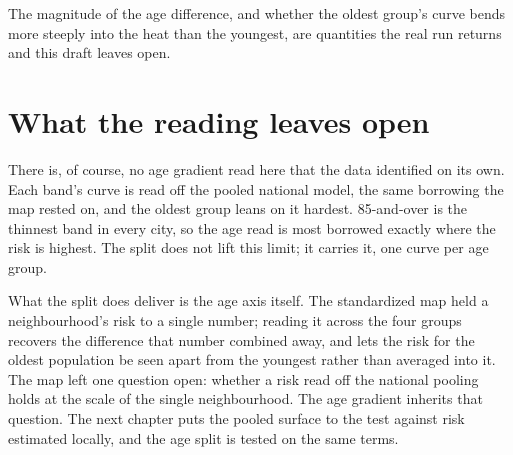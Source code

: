 The magnitude of the age difference, and whether the oldest group's curve
bends more steeply into the heat than the youngest, are quantities the real
run returns and this draft leaves open.

\section{What the reading leaves open}

There is, of course, no age gradient read here that the data identified on
its own. Each band's curve is read off the pooled national model, the same
borrowing the map rested on, and the oldest group leans on it hardest.
85-and-over is the thinnest band in every city, so the age read is most
borrowed exactly where the risk is highest. The split does not lift this
limit; it carries it, one curve per age group.

What the split does deliver is the age axis itself. The standardized map
held a neighbourhood's risk to a single number; reading it across the four
groups recovers the difference that number combined away, and lets the
risk for the oldest population be seen apart from the youngest rather than
averaged into it. The map left one question open: whether a risk read off
the national pooling holds at the scale of the single neighbourhood. The
age gradient inherits that question. The next chapter puts the pooled
surface to the test against risk estimated locally, and the age split is
tested on the same terms.
